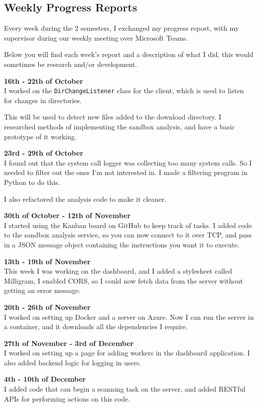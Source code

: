 \subsection{Weekly Progress Reports}
Every week during the 2 semesters, I exchanged my progress report,
with my supervisor during our weekly meeting over Microsoft Teams.

Below you will find each week's report and a description of what I did,
this would sometimes be research and/or development.

\textbf{16th - 22th of October} \\
I worked on the \texttt{DirChangeListener} class for the client,
which is used to listen for changes in directories.

This will be used to detect new files added to the download directory.
I researched methods of implementing the sandbox analysis,
and have a basic prototype of it working.

\textbf{23rd - 29th of October} \\
I found out that the system call logger was collecting too many system calls.
So I needed to filter out the ones I'm not interested in.
I made a filtering program in Python to do this.

I also refactored the analysis code to make it cleaner.

\textbf{30th of October - 12th of November} \\
I started using the Kanban board on GitHub to keep track of tasks.
I added code to the sandbox analysis service, so you can now connect to it over TCP,
and pass in a JSON message object containing the instructions you want it to execute.

\textbf{13th - 19th of November} \\
This week I was working on the dashboard, and I added a stylesheet called Milligram,
I enabled CORS, so I could now fetch data from the server without getting an error message.

\textbf{20th - 26th of November} \\
I worked on setting up Docker and a server on Azure.
Now I can run the server in a container, and it downloads all the dependencies I require.

\textbf{27th of November - 3rd of December} \\
I worked on setting up a page for adding workers in the dashboard application.
I also added backend logic for logging in users.

\textbf{4th - 10th of December} \\
I added code that can begin a scanning task on the server,
and added RESTful APIs for performing actions on this code.

